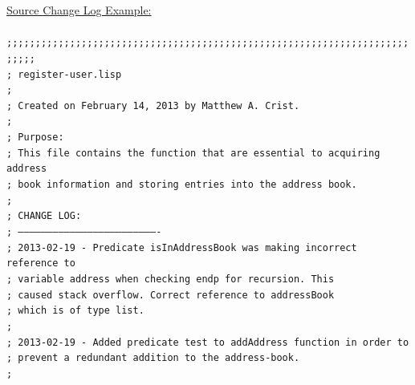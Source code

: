 \documentclass[11pt, letterpaper]{report}
\begin{document}
\begin{description}
\underline{Source Change Log Example:} \hfill \\ \hfill \\
\texttt{;;;;;;;;;;;;;;;;;;;;;;;;;;;;;;;;;;;;;;;;;;;;;;;;;;;;;;;;;;;;;;;;;;;;;;;;;;;} \hfill \\
\texttt{; register-user.lisp                                                       } \hfill \\
\texttt{;                                                                          } \hfill \\
\texttt{; Created on February 14, 2013 by Matthew A. Crist.                        } \hfill \\
\texttt{;                                                                          } \hfill \\
\texttt{; Purpose:                                                                 } \hfill \\
\texttt{; This file contains the function that are essential to acquiring address  } \hfill \\
\texttt{; book information and storing entries into the address book.              } \hfill \\
\texttt{;                                                                          } \hfill \\
\texttt{; CHANGE LOG:                                                              } \hfill \\
\texttt{; -------------------------------------------------------------------------} \hfill \\
\texttt{; 2013-02-19 - Predicate isInAddressBook was making incorrect reference to } \hfill \\
\texttt{;              variable address when checking endp for recursion.  This    } \hfill \\
\texttt{;              caused stack overflow.  Correct reference to addressBook    } \hfill \\
\texttt{;              which is of type list.                                      } \hfill \\
\texttt{;                                                                          } \hfill \\
\texttt{; 2013-02-19 - Added predicate test to addAddress function in order to     } \hfill \\
\texttt{;              prevent a redundant addition to the address-book.           } \hfill \\
\texttt{;                                                                          } \hfill \\

\end{description}
\end{document}
